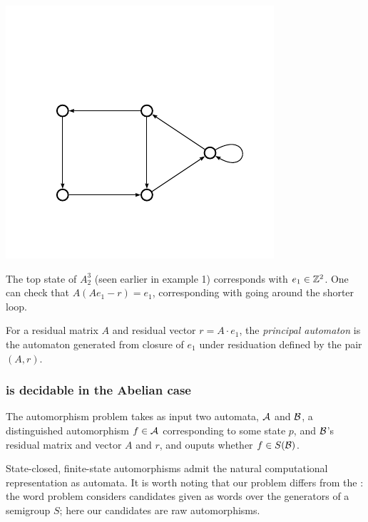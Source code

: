 \documentclass[11pt, titlepage]{article}
\begin{document}
\begin{example}
\begin{center}
\includegraphics[scale=0.5]{figures/pent}
\end{center}
The top state of $A^3_2$ (seen earlier in example 1) corresponds with
$e_1 \in \mathbb{Z}^2$. One can check that $A(Ae_1 - r) = e_1$, corresponding
with going around the shorter loop.
\end{example}

\begin{definition}
  For a residual matrix $A$ and residual vector $r = A \cdot e_1$, the
  \emph{principal automaton} is the automaton generated from closure
  of $e_1$ under residuation defined by the pair $(A, r)$.
\end{definition}

\subsubsection{ is decidable in the Abelian case}

\begin{definition}
  The automorphism  problem takes as input two
  automata, $\mathcal{A}$ and $\mathcal{B}$, a distinguished automorphism $f \in \mathcal{A}$
  corresponding to some state $p$, and $\mathcal{B}$'s residual matrix and
  vector $A$ and $r$, and ouputs whether $f \in S(\mathcal{B})$.
\end{definition}

State-closed, finite-state automorphisms admit the natural
computational representation as automata. It is worth noting that our
 problem differs from the :
the word problem considers candidates given as words over the
generators of a semigroup $S$; here our candidates are raw
automorphisms.
\end{document}

